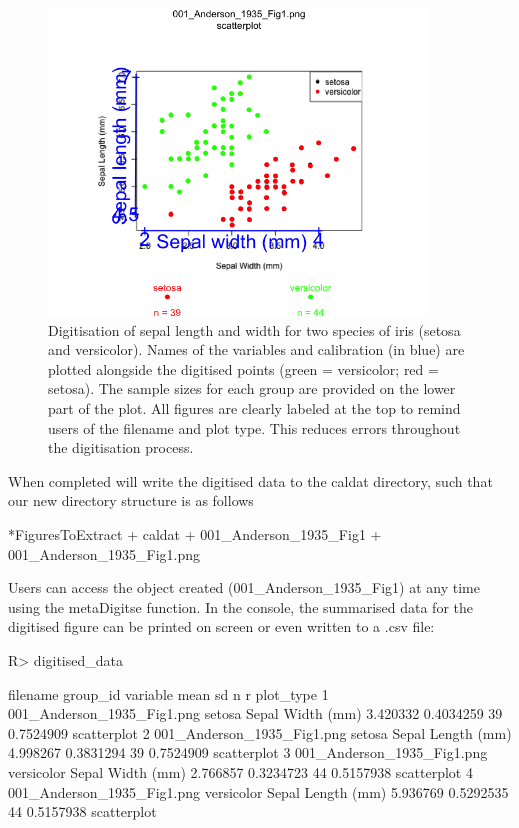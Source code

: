 \documentclass[article]{jss}
\begin{document}
\begin{figure}[!h] 
 \includegraphics[width=0.9\textwidth]{001_Anderson_1935_Fig1_digitised.png} 
 \caption{Digitisation of sepal length and width for two species of iris (setosa and versicolor). Names of the variables and calibration (in blue) are plotted alongside the digitised points (green = versicolor; red = setosa). The sample sizes for each group are provided on the lower part of the plot. All figures are clearly labeled at the top to remind users of the filename and plot type. This reduces errors throughout the digitisation process.}
\label{fig:scatter_extract}
\end{figure}

When completed  will write the digitised data to the caldat directory, such that our new directory structure is as follows

\begin{CodeChunk}
\begin{CodeOutput}
*FiguresToExtract
    + caldat
        + 001_Anderson_1935_Fig1
    + 001_Anderson_1935_Fig1.png
\end{CodeOutput}
\end{CodeChunk}

Users can access the  object created (001\_Anderson\_1935\_Fig1) at any time using the metaDigitse function. In the  console, the summarised data for the digitised figure can be printed on screen or even written to a .csv file:

\begin{CodeChunk}
\begin{CodeInput}
R> digitised_data
\end{CodeInput}
\begin{CodeOutput}
 filename   group_id         variable       mean      sd  n         r  plot_type
1 001_Anderson_1935_Fig1.png     setosa  Sepal Width (mm) 3.420332 0.4034259 39 0.7524909 scatterplot
2 001_Anderson_1935_Fig1.png     setosa Sepal Length (mm) 4.998267 0.3831294 39 0.7524909 scatterplot
3 001_Anderson_1935_Fig1.png versicolor  Sepal Width (mm) 2.766857 0.3234723 44 0.5157938 scatterplot
4 001_Anderson_1935_Fig1.png versicolor Sepal Length (mm) 5.936769 0.5292535 44 0.5157938 scatterplot
\end{CodeOutput}
\end{CodeChunk}
\end{document}
